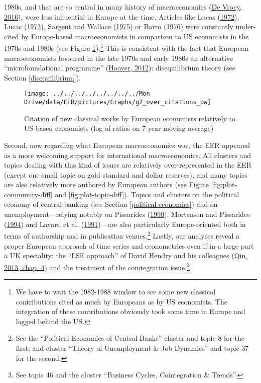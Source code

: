 \documentclass[
  12pt,
  onecolumn]{article}
\begin{document}
1980s, and that are so central in many history of macroeconomics
(\protect\hyperlink{ref-devroey2016}{De Vroey, 2016}), were less
influential in Europe at the time. Articles like Lucas
(\protect\hyperlink{ref-lucas1972}{1972}), Lucas
(\protect\hyperlink{ref-lucas1973}{1973}), Sargent and Wallace
(\protect\hyperlink{ref-sargent1975}{1975}) or Barro
(\protect\hyperlink{ref-barro1976}{1976}) were constantly under-cited by
Europe-based macroeconomists in comparison to US economists in the 1970s
and 1980s (see Figure \ref{fig:plot-new-classical}).\footnote{We have to
  wait the 1982-1988 window to see some new classical contributions
  cited as much by Europeans as by US economists. The integration of
  these contributions obviously took some time in Europe and lagged
  behind the US.} This is consistent with the fact that European
macroeconomists favoured in the late 1970s and early 1980s an
alternative ``microfoundational programme''
(\protect\hyperlink{ref-hoover2012}{Hoover, 2012}): disequilibrium
theory (see Section \ref{disequilibrium}).

\begin{figure}[h]

{\centering \texttt{[image: ../../../../../../../../Mon Drive/data/EER/pictures/Graphs/g2\_over\_citations\_bw]} 

}

\caption{Citation of new classical works by European economists relatively to US-based economists (log of ratios on 7-year moving average)}\label{fig:plot-new-classical}
\end{figure}

Second, now regarding what European macroeconomics was, the EER appeared
as a more welcoming support for international macroeconomics. All
clusters and topics dealing with this kind of issues are relatively
over-represented in the EER (except one small topic on gold standard and
dollar reserves), and many topics are also relatively more authored by
European authors (see Figure \ref{fig:plot-community-diff} and
\ref{fig:plot-topic-diff}). Topics and clusters on the political economy
of central banking (see Section \ref{political-economics}) and on
unemployment---relying notably on Pissarides
(\protect\hyperlink{ref-pissarides1990}{1990}), Mortensen and Pissarides
(\protect\hyperlink{ref-mortensen1994}{1994}) and Layard et al.
(\protect\hyperlink{ref-layard1991a}{1991})---are also particularly
Europe-oriented both in terms of authorship and in publication
venues.\footnote{See the ``Political Economics of Central Banks''
  cluster and topic 8 for the first; and cluster ``Theory of
  Unemployment \& Job Dynamics'' and topic 37 for the second.} Lastly,
our analyses reveal a proper European approach of time series and
econometrics even if in a large part a UK speciality: the ``LSE
approach'' of David Hendry and his colleagues
(\protect\hyperlink{ref-qin2013a}{Qin, 2013, chap. 4}) and the treatment
of the cointegration issue.\footnote{See topic 46 and the cluster
  ``Business Cycles, Cointegration \& Trends''.}
\end{document}
